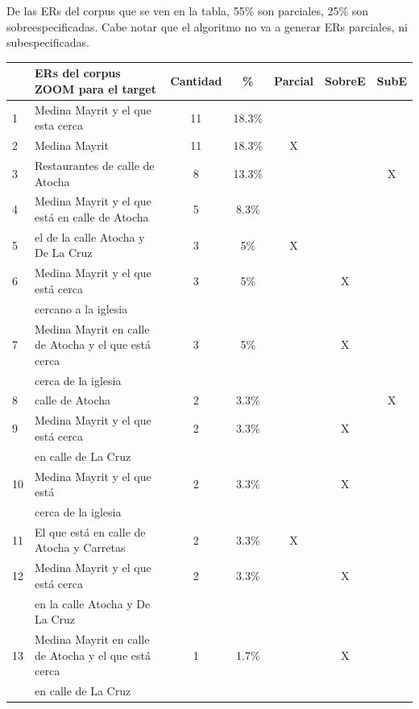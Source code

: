 De las ERs del corpus que se ven en la tabla, 55\% son parciales, 25\% son sobreespecificadas. Cabe notar que el algoritmo no va a generar ERs parciales, ni subespecificadas. 

\medskip

\begin{table}[h]
{\footnotesize
\begin{center}
\begin{tabular}{|l|l|c|c|c|c|c|}
\hline
&ERs del corpus ZOOM para el target			      & Cantidad &  \% & Parcial & SobreE & SubE\\ \hline \hline
1&Medina Mayrit y el que esta cerca        &	11	&	18.3\% &  &  &\\ \hline


2&Medina Mayrit			&11		&	18.3\%	&X& &\\  \hline


3&Restaurantes de calle de Atocha				&	8  &	13.3\%	&& &X\\ \hline

4&Medina Mayrit y el que est\'a en calle de Atocha	      &5		&	8.3\%	&&&\\ \hline

5&el de la calle Atocha y De La Cruz       &	3  &	5\%	&X & &\\  \hline
6&Medina Mayrit y el que est\'a cerca				&		3 &	5\%  & &X&\\
&cercano a la iglesia				&	  &	&&&\\ \hline
7&Medina Mayrit en calle de Atocha y el que est\'a cerca				& 3  &	5\%	&&X&\\
&cerca de la iglesia				&	  &		&&&\\ \hline

8&calle de Atocha				&	2  &	3.3\%	&&&X\\ \hline

9&Medina Mayrit y el que est\'a cerca			&2  &	3.3\%	&&X&\\
&en calle de La Cruz	&	  &		&&&\\ \hline

10&Medina Mayrit y el que est\'a 	&	2	&	3.3\%  &&X&\\
&cerca de la iglesia				&	  &	&&&\\ \hline
11&El que est\'a en calle de Atocha y Carretas 					&	2  &	3.3\%	&X&&\\ \hline
12&Medina Mayrit y el que est\'a cerca				&	2	&	3.3\%  &&X&\\
&en la calle Atocha y De La Cruz        &	  &	&&&\\ \hline
13&Medina Mayrit en calle de Atocha y el que est\'a cerca			&1  &	1.7\%	&&X&\\
&en calle de La Cruz	&	  &		&&&\\ \hline


\end{tabular}
\end{center}}
\end{table}
